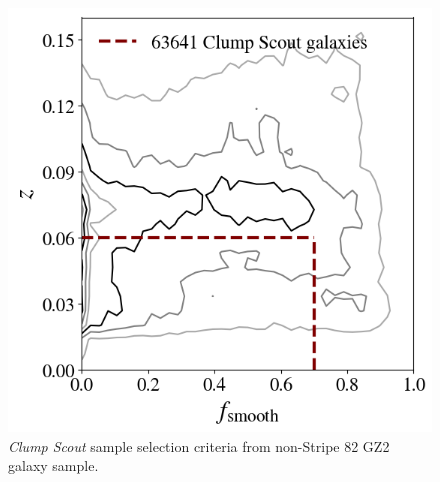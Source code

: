 \begin{figure}
\centering
\includegraphics[width=5in]{Figures/clump_scout_sample_in_z-fsmooth.png}
\caption[\textit{Clump Scout} sample selection criteria from non-Stripe 82 GZ2 galaxy sample.]{\textit{Clump Scout} sample selection criteria from non-Stripe 82 GZ2 galaxy sample.}
\label{fig: clump scout sample}
\end{figure}



